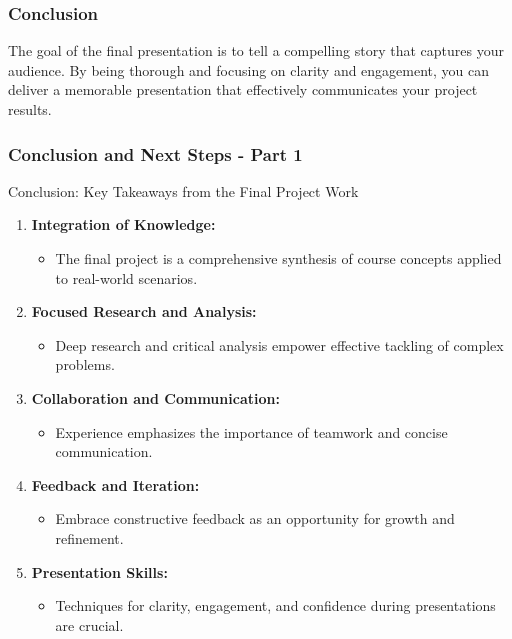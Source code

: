 \documentclass[aspectratio=169]{beamer}
\begin{document}
\begin{frame}[fragile]
    \frametitle{Conclusion}
    The goal of the final presentation is to tell a compelling story that captures your audience. 
    By being thorough and focusing on clarity and engagement, you can deliver a memorable presentation 
    that effectively communicates your project results.
\end{frame}

\begin{frame}[fragile]
  \frametitle{Conclusion and Next Steps - Part 1}
  
  \begin{block}{Conclusion: Key Takeaways from the Final Project Work}
    \begin{enumerate}
      \item \textbf{Integration of Knowledge:}
      \begin{itemize}
        \item The final project is a comprehensive synthesis of course concepts applied to real-world scenarios.
      \end{itemize}
      
      \item \textbf{Focused Research and Analysis:}
      \begin{itemize}
        \item Deep research and critical analysis empower effective tackling of complex problems.
      \end{itemize}
      
      \item \textbf{Collaboration and Communication:}
      \begin{itemize}
        \item Experience emphasizes the importance of teamwork and concise communication.
      \end{itemize}
      
      \item \textbf{Feedback and Iteration:}
      \begin{itemize}
        \item Embrace constructive feedback as an opportunity for growth and refinement.
      \end{itemize}
      
      \item \textbf{Presentation Skills:}
      \begin{itemize}
        \item Techniques for clarity, engagement, and confidence during presentations are crucial.
      \end{itemize}
    \end{enumerate}
  \end{block}
\end{frame}
\end{document}
